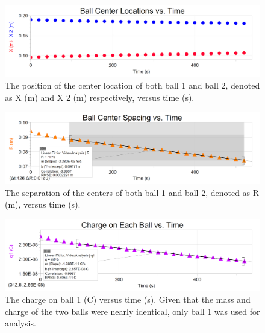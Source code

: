 \documentclass[oneside,12pt]{amsart}
\begin{document}
		\begin{figure}[h]
		\includegraphics[width=\linewidth,scale=0.01]{LocvTime.png}
		\caption{The position of the center location of both ball 1 and ball 2, denoted as X (m) and X 2 (m) respectively, versus time (s).}
		\label{loc}
	\end{figure}
\begin{figure}[h]
	\includegraphics[width=\linewidth,scale=0.01]{SpacevTime.png}
	\caption{The separation of the centers of both ball 1 and ball 2, denoted as R (m), versus time (s).}
	\label{Space}
\end{figure}

\begin{figure}[h]
	\includegraphics[width=\linewidth,scale=0.01]{ChargevTime.png}
	\caption{The charge on ball 1 (C) versus time (s). Given that the mass and charge of the two balls were nearly identical, only ball 1 was used for analysis.}
	\label{Charge}
	
\end{figure}
\end{document}
